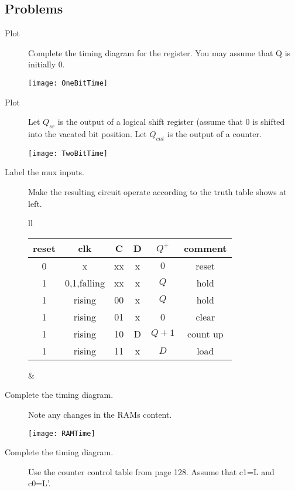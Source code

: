 \subsection{Problems}
\begin{description}

\item[Plot] Complete the timing diagram for the register.
You may assume that Q is initially 0.

\texttt{[image: OneBitTime]}

\item[Plot] Let 
$Q_{sr}$ is the output of a logical shift register
(assume that 0 is shifted into the vacated bit position.
Let $Q_{cnt}$ is the output of a counter.

\texttt{[image: TwoBitTime]}


\item[Label the mux inputs.]
Make the resulting circuit operate according to the
truth table shows at left.

\begin{tabular}{ll} 
\begin{tabular}{c|c|c|c||c||c}
reset & clk          & C  & D   & $Q^+$  & comment     \\ \hline
0     & x            & xx & x   & $0$    & reset       \\ \hline
1     & 0,1,falling  & xx & x   & $Q$    & hold        \\ \hline
1     & rising       & 00 & x   & $Q$    & hold        \\ \hline
1     & rising       & 01 & x   & 0      & clear       \\ \hline
1     & rising       & 10 & D   & $Q+1$  & count up    \\ \hline
1     & rising       & 11 & x   & $D$    & load        \\ 
\end{tabular}
&
\end{tabular}

\vspace{1cm}

\item[Complete the timing diagram.]  Note any changes in
the RAMs content.

\texttt{[image: RAMTime]}

\pagebreak

\item[Complete the timing diagram.]  Use the counter control table 
from page 128.  Assume that c1=L and c0=L'.


\end{description}
